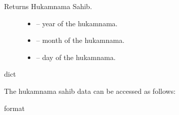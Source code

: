 \documentclass[letterpaper,10pt,english]{sphinxmanual}
\begin{document}
\begin{sphinxVerbatim}[commandchars=\\\{\}]
    
\end{sphinxVerbatim}

\sphinxAtStartPar
Returns Hukamnama Sahib.
\begin{description}
\item[{}] \leavevmode\begin{itemize}
\item {} 
\sphinxAtStartPar
{}  –  year of the hukamnama.

\item {} 
\sphinxAtStartPar
{}  –  month of the hukamnama.

\item {} 
\sphinxAtStartPar
{}  –  day of the hukamnama.

\end{itemize}

\end{description}

\sphinxAtStartPar
{}    dict

\begin{DUlineblock}{0em}
\item[] 
\item[] The hukamnama sahib data can be accessed as follows:
\end{DUlineblock}

\begin{sphinxVerbatim}[commandchars=\\\{\}]
    \PYG{p}{[}\PYG{p}{]} 
\end{sphinxVerbatim}

\sphinxAtStartPar
{} format
\end{document}
